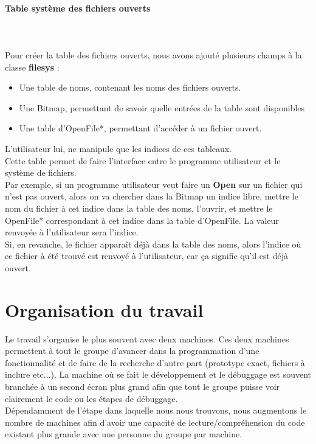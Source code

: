 \documentclass{report}
\newcommand{\myparagraph}[1]{\paragraph*{#1}\mbox{}\\}
\begin{document}
\myparagraph{Table système des fichiers ouverts}\\	
Pour créer la table des fichiers ouverts, nous avons ajouté plusieurs champs à la classe \textbf{filesys} :
\begin{itemize}
\item Une table de noms, contenant les noms des fichiers ouverts.
\item Une Bitmap, permettant de savoir quelle entrées de la table sont disponibles
\item Une table d'OpenFile*, permettant d’accéder à un fichier ouvert.
\end{itemize}
L'utilisateur lui, ne manipule que les indices de ces tableaux.\\
Cette table permet de faire l'interface entre le programme utilisateur et le système de fichiers.\\

Par exemple, si un programme utilisateur veut faire un \textbf{Open} sur un fichier qui n'est pas ouvert, alors on va chercher dans la Bitmap un indice libre, mettre le nom du fichier à cet indice dans la table des noms, l'ouvrir, et mettre le OpenFile* correspondant à cet indice dans la table d'OpenFile.
La valeur renvoyée à l'utilisateur sera l'indice.\\

Si, en revanche, le fichier apparaît déjà dans la table des noms, alors l'indice où ce fichier à été trouvé est renvoyé à l'utilisateur, car ça signifie qu'il est déjà ouvert.

\section*{Organisation du travail}
Le travail s'organise le plus souvent avec deux machines. Ces deux machines permettent à tout le groupe d'avancer dans la programmation d'une fonctionnalité et de faire de la recherche d'autre part (prototype exact, fichiers à inclure etc...). La machine où se fait le développement et le débuggage est souvent branchée à un second écran plus grand afin que tout le groupe puisse voir clairement le code ou les étapes de débuggage.\\

Dépendamment de l'étape dans laquelle nous nous trouvons, nous augmentons le nombre de machines afin d'avoir une capacité de lecture/compréhension du code existant plus grande avec une personne du groupe par machine.\\
\end{document}
